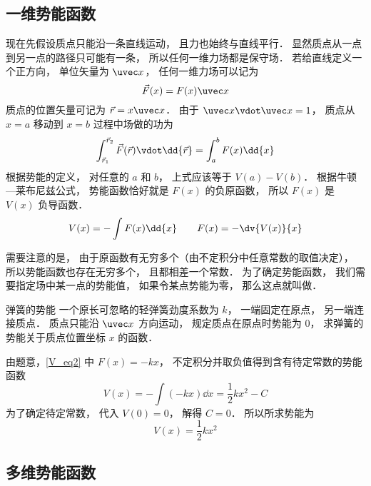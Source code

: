 \subsection{一维势能函数}

现在先假设质点只能沿一条直线运动， 且力也始终与直线平行． 显然质点从一点到另一点的路径只可能有一条， 所以任何一维力场都是保守场． 若给直线定义一个正方向， 单位矢量为 $\uvec x$， 任何一维力场可以记为
\begin{equation}\label{V_eq2}
\vec F(x) = F(x) \uvec x
\end{equation}
质点的位置矢量可记为 $\vec r = x \uvec x$． 由于 $\uvec x \vdot \uvec x = 1$， 质点从 $x = a$ 移动到 $x=b$ 过程中场做的功为
\begin{equation}
\int_{\vec r_1}^{\vec r_2} \vec F(\vec r) \vdot \dd{\vec r}
= \int_a^b F(x) \dd{x}
\end{equation}
根据势能的定义， 对任意的 $a$ 和 $b$， 上式应该等于 $V(a) - V(b)$． 根据牛顿—莱布尼兹公式， 势能函数恰好就是 $F(x)$ 的负原函数， 所以 $F(x)$ 是 $V(x)$ 负导函数．
\begin{equation}\label{V_eq8}
V(x) = -\int F(x) \dd{x}
\qquad
F(x) = -\dv{V(x)}{x}
\end{equation}

需要注意的是， 由于原函数有无穷多个（由不定积分中任意常数的取值决定）， 所以势能函数也存在无穷多个， 且都相差一个常数． 为了确定势能函数， 我们需要指定场中某一点的势能值， 如果令某点势能为零， 那么这点就叫做．

\begin{exam}{弹簧的势能}
一个原长可忽略的轻弹簧劲度系数为 $k$， 一端固定在原点， 另一端连接质点． 质点只能沿 $\uvec x$ 方向运动， 规定质点在原点时势能为 $0$， 求弹簧的势能关于质点位置坐标 $x$ 的函数． 

由题意，\autoref{V_eq2} 中 $F(x) = -kx$， 不定积分并取负值得到含有待定常数的势能函数
\begin{equation}
V(x) = -\int (-kx) \dd{x} = \frac12 k x^2 - C
\end{equation}
为了确定待定常数， 代入 $V(0) = 0$， 解得 $C = 0$． 所以所求势能为
\begin{equation}
V(x) =  \frac12 k x^2
\end{equation}
\end{exam}


\subsection{多维势能函数}

